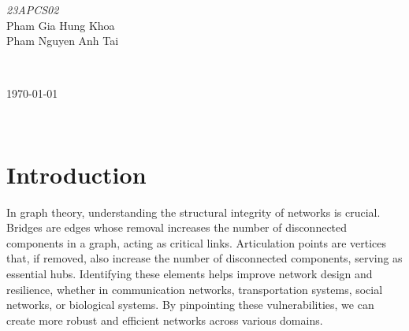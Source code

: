 \documentclass{article}
\begin{document}
\begin{titlepage}

\begin{minipage}{0.4\textwidth}
\begin{center} \large

\emph{23APCS02}\\

Pham Gia Hung Khoa\\
Pham Nguyen Anh Tai\\

\end{center}

\end{minipage}\\[2cm]


\vfill %

{\large \begin{otherlanguage}{english}\today\end{otherlanguage}}\\[2cm] %




\end{titlepage}

\begin{otherlanguage}{english}\tableofcontents\end{otherlanguage}

\newpage

\section{Introduction}

In graph theory, understanding the structural integrity of networks is crucial. Bridges are edges whose removal increases the number of disconnected components in a graph, acting as critical links. Articulation points are vertices that, if removed, also increase the number of disconnected components, serving as essential hubs. Identifying these elements helps improve network design and resilience, whether in communication networks, transportation systems, social networks, or biological systems. By pinpointing these vulnerabilities, we can create more robust and efficient networks across various domains.\\
\end{document}
